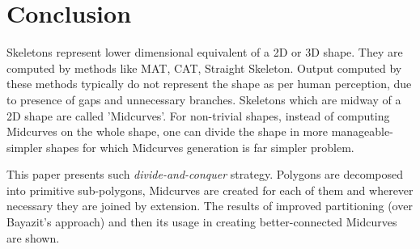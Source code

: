 \section{Conclusion}

Skeletons represent lower dimensional equivalent of a 2D or 3D shape. They are computed by methods like MAT, CAT, Straight Skeleton. Output computed by these methods typically do not represent the shape as per human perception, due to presence of gaps and unnecessary branches. Skeletons which are midway of a 2D shape are called 'Midcurves'. For non-trivial shapes, instead of computing Midcurves on the whole shape, one can divide the shape in more manageable-simpler shapes for which Midcurves generation is far simpler problem. 

This paper presents such {\em divide-and-conquer} strategy. Polygons are decomposed into primitive sub-polygons, Midcurves are created for each of them and wherever necessary they are joined by extension.  The results of improved partitioning (over Bayazit's \cite{Bayazit} approach) and then its usage in creating better-connected Midcurves are shown.
